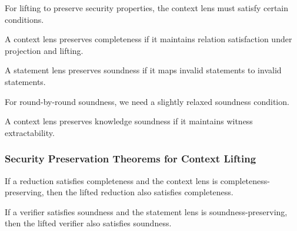 For lifting to preserve security properties, the context lens must satisfy certain conditions.

\begin{definition}
    \label{def:context_lens_is_complete}
    A context lens preserves completeness if it maintains relation satisfaction under projection and lifting.
\end{definition}

\begin{definition}
    \label{def:statement_lens_is_sound}
    A statement lens preserves soundness if it maps invalid statements to invalid statements.
\end{definition}

\begin{definition}
    \label{def:statement_lens_is_rbr_sound}
    For round-by-round soundness, we need a slightly relaxed soundness condition.
\end{definition}

\begin{definition}
    \label{def:context_lens_is_knowledge_sound}
    A context lens preserves knowledge soundness if it maintains witness extractability.
\end{definition}

\subsubsection{Security Preservation Theorems for Context Lifting}

\begin{theorem}
    \label{thm:lift_context_completeness}
    If a reduction satisfies completeness and the context lens is completeness-preserving, then the lifted reduction also satisfies completeness.
\end{theorem}

\begin{theorem}
    \label{thm:lift_context_soundness}
    If a verifier satisfies soundness and the statement lens is soundness-preserving, then the lifted verifier also satisfies soundness.
\end{theorem}

